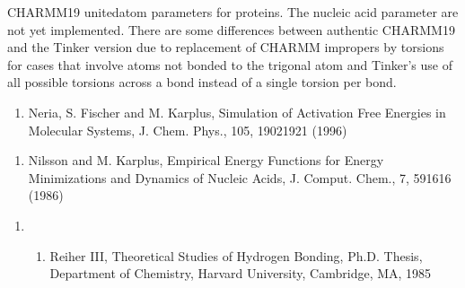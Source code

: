 \documentclass[letterpaper,11pt,english]{sphinxmanual}
\begin{document}
CHARMM19 united\sphinxhyphen{}atom parameters for proteins. The nucleic acid parameter are not yet implemented. There are some differences between authentic CHARMM19 and the Tinker version due to replacement of CHARMM impropers by torsions for cases that involve atoms not bonded to the trigonal atom and Tinker’s use of all possible torsions across a bond instead of a single torsion per bond.
\begin{enumerate}
%
\setcounter{enumi}{4}
\item {} 
Neria, S. Fischer and M. Karplus, Simulation of Activation Free Energies in Molecular Systems, J. Chem. Phys., 105, 1902\sphinxhyphen{}1921 (1996)

\end{enumerate}
\begin{enumerate}
%
\setcounter{enumi}{11}
\item {} 
Nilsson and M. Karplus, Empirical Energy Functions for Energy Minimizations and Dynamics of Nucleic Acids, J. Comput. Chem., 7, 591\sphinxhyphen{}616 (1986)

\end{enumerate}
\begin{enumerate}
%
\setcounter{enumi}{22}
\item {} \begin{enumerate}
%
\setcounter{enumii}{4}
\item {} 
Reiher III, Theoretical Studies of Hydrogen Bonding, Ph.D. Thesis, Department of Chemistry, Harvard University, Cambridge, MA, 1985

\end{enumerate}

\end{enumerate}

\end{document}
